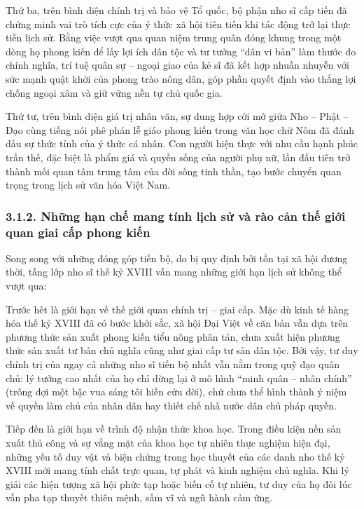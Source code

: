Thứ ba, trên bình diện chính trị và bảo vệ Tổ quốc, bộ phận nho sĩ cấp tiến đã chứng minh vai trò tích cực của ý thức xã hội tiên tiến khi tác động trở lại thực tiễn lịch sử. Bằng việc vượt qua quan niệm trung quân đóng khung trong một dòng họ phong kiến để lấy lợi ích dân tộc và tư tưởng ``dân vi bản'' làm thước đo chính nghĩa, trí tuệ quân sự -- ngoại giao của kẻ sĩ đã kết hợp nhuần nhuyễn với sức mạnh quật khởi của phong trào nông dân, góp phần quyết định vào thắng lợi chống ngoại xâm và giữ vững nền tự chủ quốc gia.

Thứ tư, trên bình diện giá trị nhân văn, sự dung hợp cởi mở giữa Nho -- Phật -- Đạo cùng tiếng nói phê phán lễ giáo phong kiến trong văn học chữ Nôm đã đánh dấu sự thức tỉnh của ý thức cá nhân. Con người hiện thực với nhu cầu hạnh phúc trần thế, đặc biệt là phẩm giá và quyền sống của người phụ nữ, lần đầu tiên trở thành mối quan tâm trung tâm của đời sống tinh thần, tạo bước chuyển quan trọng trong lịch sử văn hóa Việt Nam.

\subsubsection*{3.1.2. Những hạn chế mang tính lịch sử và rào cản thế giới quan giai cấp phong kiến}

Song song với những đóng góp tiến bộ, do bị quy định bởi tồn tại xã hội đương thời, tầng lớp nho sĩ thế kỷ XVIII vẫn mang những giới hạn lịch sử không thể vượt qua:

Trước hết là giới hạn về thế giới quan chính trị -- giai cấp. Mặc dù kinh tế hàng hóa thế kỷ XVIII đã có bước khởi sắc, xã hội Đại Việt về căn bản vẫn dựa trên phương thức sản xuất phong kiến tiểu nông phân tán, chưa xuất hiện phương thức sản xuất tư bản chủ nghĩa cũng như giai cấp tư sản dân tộc. Bởi vậy, tư duy chính trị của ngay cả những nho sĩ tiến bộ nhất vẫn nằm trong quỹ đạo quân chủ: lý tưởng cao nhất của họ chỉ dừng lại ở mô hình ``minh quân -- nhân chính'' (trông đợi một bậc vua sáng tôi hiền cứu đời), chứ chưa thể hình thành ý niệm về quyền làm chủ của nhân dân hay thiết chế nhà nước dân chủ pháp quyền.

Tiếp đến là giới hạn về trình độ nhận thức khoa học. Trong điều kiện nền sản xuất thủ công và sự vắng mặt của khoa học tự nhiên thực nghiệm hiện đại, những yếu tố duy vật và biện chứng trong học thuyết của các danh nho thế kỷ XVIII mới mang tính chất trực quan, tự phát và kinh nghiệm chủ nghĩa. Khi lý giải các hiện tượng xã hội phức tạp hoặc biến cố tự nhiên, tư duy của họ đôi lúc vẫn pha tạp thuyết thiên mệnh, sấm vĩ và ngũ hành cảm ứng.

